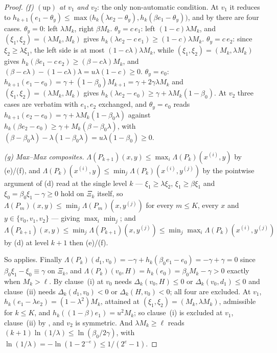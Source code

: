 \documentclass[11pt]{article}
\theoremstyle{plain}
\theoremstyle{definition}
\begin{document}
\begin{proof}
\emph{(f) $(\mathrm{up})$ at $v_1$ and $v_2$}: the only non-automatic
condition. At $v_1$ it reduces to
$h_{k+1}(e_1-\theta_y)\le\max\bigl(h_k(\lambda e_2-\theta_y),
h_k(\beta e_1-\theta_y)\bigr)$, and by  there are four
cases. $\theta_y=0$: left $\lambda M_k$, right $\beta M_k$. $\theta_y=c\,e_1$: left
$(1-c)\lambda M_k$, and $(\xi_1,\xi_2)=(\lambda M_k,M_k)$ gives
$h_k(\lambda e_2-c\,e_1)\ge(1-c)\lambda M_k$. $\theta_y=c\,e_2$: since
$\xi_2\ge\lambda\xi_1$, the left side is at most $(1-c\lambda)\lambda M_k$,
while $(\xi_1,\xi_2)=(M_k,\lambda M_k)$ gives
$h_k(\beta e_1-c\,e_2)\ge(\beta-c\lambda)M_k$, and
$(\beta-c\lambda)-(1-c\lambda)\lambda=u\lambda(1-c)\ge0$. $\theta_y=e_0$:
$h_{k+1}(e_1-e_0)=\gamma+(1-\beta_0)M_{k+1}=\gamma+2\gamma\lambda M_k$ and
$(\xi_1,\xi_2)=(\lambda M_k,M_k)$ gives $h_k(\lambda e_2-e_0)\ge
\gamma+\lambda M_k(1-\beta_0)$. At $v_2$ three cases are verbatim with
$e_1,e_2$ exchanged, and $\theta_y=e_0$ reads
$h_{k+1}(e_2-e_0)=\gamma+\lambda M_k(1-\beta_0\lambda)$ against
$h_k(\beta e_2-e_0)\ge\gamma+M_k(\beta-\beta_0\lambda)$, with
$(\beta-\beta_0\lambda)-\lambda(1-\beta_0\lambda)=u\lambda(1-\beta_0)\ge0$.

\emph{(g) Max--Max composites.} $\Lambda(P_{k+1})(x,y)\le
\max_i\Lambda(P_k)(x^{(i)},y)$ by (e)/(f), and
$\Lambda(P_k)(x^{(i)},y)\le\min_j\Lambda(P_k)(x^{(i)},y^{(j)})$ by the
pointwise argument of (d) read at the single level $k$ --- $\xi_1\ge\lambda\xi_2$,
$\xi_1\ge\beta\xi_1$ and $\xi_0=\beta_0\xi_1-\gamma\ge0$ hold on $\Xi_k$ itself,
so $\Lambda(P_m)(x,y)\le\min_j\Lambda(P_m)(x,y^{(j)})$ for every $m\le K$,
every $x$ and $y\in\{v_0,v_1,v_2\}$ --- giving $\max_i\min_j$; and $\Lambda(P_{k+1})(x,y)\le
\min_j\Lambda(P_{k+1})(x,y^{(j)})\le\min_j\max_i\Lambda(P_k)(x^{(i)},y^{(j)})$
by (d) at level $k+1$ then (e)/(f).

So  applies. Finally
$\Lambda(P_k)(d_1,v_0)=-\gamma+h_k(\beta_0e_1-e_0)=-\gamma+\gamma=0$ since
$\beta_0\xi_1-\xi_0\equiv\gamma$ on $\Xi_k$, and
$\Lambda(P_k)(v_0,H)=h_k(e_0)=\beta_0M_k-\gamma>0$ exactly when $M_k>\ell$.
By  clause~(i) at $v_0$ needs $\Delta_k(v_0,H)\le0$ or
$\Delta_k(v_0,d_1)\le0$ and clause~(ii) needs $\Delta_k(d_1,v_0)<0$ or
$\Delta_k(H,v_0)<0$; all four are excluded. At $v_1$,
$h_k(e_1-\lambda e_2)=(1-\lambda^{2})M_k$, attained at
$(\xi_1,\xi_2)=(M_k,\lambda M_k)$, admissible for $k\le K$, and
$h_k((1-\beta)e_1)=u^{2}M_k$; so clause~(i) is excluded at $v_1$, clause~(ii)
by , and $v_2$ is symmetric. And $\lambda M_k\ge\ell$ reads
$(k+1)\ln(1/\lambda)\le\ln(\beta_0/2\gamma)$, with
$\ln(1/\lambda)=-\ln(1-2^{-e})\le 1/(2^{e}-1)$.
\end{proof}
\end{document}
